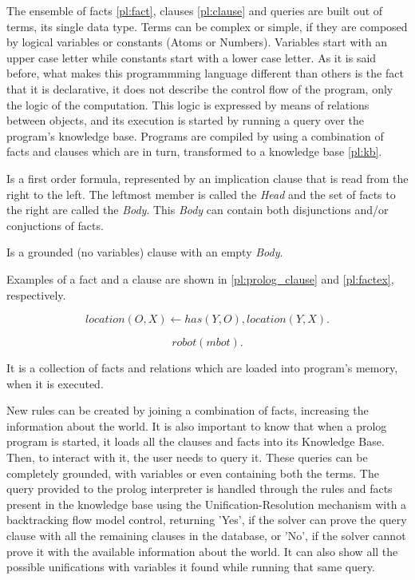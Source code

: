 The ensemble of facts \ref{pl:fact}, clauses \ref{pl:clause} and queries are built out of terms, its single data
type. Terms can be complex or simple, if they are composed by logical variables or
constants (Atoms or Numbers). Variables start with an upper case letter while constants 
start with a lower case letter.
As it is said before, what makes this programmming language different than
others is the fact that it is declarative, it does not describe the control flow
of the program, only the logic of the computation. This logic is expressed by
means of relations between objects, and its execution is started by running a
query over the program's knowledge base. Programs are compiled by using a
combination of facts and clauses which are in turn,
transformed to a knowledge base \ref{pl:kb}.

\begin{definition}[Clause]
    Is a first order formula, represented by an
    implication clause that is read from the right to the left. The leftmost
    member is called the \textit{Head}
    and the set of facts to the right are called the \textit{Body}. This
    \textit{Body} can contain both disjunctions and/or conjuctions of facts.
    \label{pl:clause}
\end{definition}

\begin{definition}[Fact]
Is a grounded (no variables) clause with an empty \textit{Body}.
  \label{pl:fact}
\end{definition}

Examples of a fact and a clause are shown in \ref{pl:prolog_clause} and \ref{pl:factex}, 
respectively.

\begin{equation}
    location(O, X) \leftarrow has(Y, O), location(Y, X).
    \label{pl:prolog_clause}
\end{equation}

\begin{equation}
    robot(mbot).
    \label{pl:factex}
\end{equation}

\begin{definition}
    It is a collection of facts and relations which are loaded into program's
    memory, when it is executed.
    \label{pl:kb}
\end{definition}


New rules can be created by joining a combination of facts, increasing the
information about the world.
It is also important to know that when a prolog program is started, it loads all
the clauses and facts into its Knowledge Base. Then, to interact with it, the
user needs to query it. These queries can be completely grounded, with variables
or even containing both the terms.
The query provided to the prolog interpreter is
handled through the rules and facts present in the knowledge base using the
Unification-Resolution mechanism with a backtracking flow model control,
returning 'Yes', if the solver can prove the query clause with all the remaining
clauses in the database, or 'No', if the solver cannot prove it with the
available information about the world.
It can also show all the possible unifications with variables it found while
running that same query.

